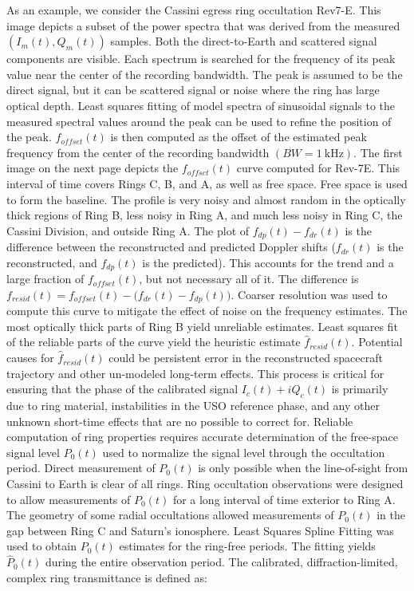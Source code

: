 \documentclass{article}
\theoremstyle{mystyle}
\begin{document}
\noindent As an example, we consider the Cassini egress ring occultation Rev7-E. This image depicts a subset of the power spectra that was derived from the measured $(I_{m}(t), Q_{m}(t))$ samples. Both the direct-to-Earth and scattered signal components are visible. Each spectrum is searched for the frequency of its peak value near the center of the recording bandwidth. The peak is assumed to be the direct signal, but it can be scattered signal or noise where the ring has large optical depth. Least squares fitting of model spectra of sinusoidal signals to the measured spectral values around the peak can be used to refine the position of the peak. $f_{offset}(t)$ is then computed as the offset of the estimated peak frequency from the center of the recording bandwidth $(BW = 1\ \textrm{kHz})$. The first image on the next page depicts the $f_{offset}(t)$ curve computed for Rev-7E. This interval of time covers Rings C, B, and A, as well as free space. Free space is used to form the baseline. The profile is very noisy and almost random in the optically thick regions of Ring B, less noisy in Ring A, and much less noisy in Ring C, the Cassini Division, and outside Ring A. The plot of $f_{dp}(t) - f_{dr}(t)$ is the difference between the reconstructed and predicted Doppler shifts ($f_{dr}(t)$ is the reconstructed, and $f_{dp}(t)$ is the predicted). This accounts for the trend and a large fraction of $f_{offset}(t)$, but not necessary all of it. The difference is $f_{resid}(t) = f_{offset}(t) - \big(f_{dr}(t)-f_{dp}(t)\big)$. Coarser resolution was used to compute this curve to mitigate the effect of noise on the frequency estimates.
\noindent The most optically thick parts of Ring B yield unreliable estimates. Least squares fit of the reliable parts of the curve yield the heuristic estimate $\hat{f}_{resid}(t)$. Potential causes for $\hat{f}_{resid}(t)$ could be persistent error in the reconstructed spacecraft trajectory and other un-modeled long-term effects. This process is critical for ensuring that the phase of the calibrated signal $I_{c}(t)+iQ_{c}(t)$ is primarily due to ring material, instabilities in the USO reference phase, and any other unknown short-time effects that are no possible to correct for. Reliable computation of ring properties requires accurate determination of the free-space signal level $P_{0}(t)$ used to normalize the signal level through the occultation period. Direct measurement of $P_{0}(t)$ is only possible when the line-of-sight from Cassini to Earth is clear of all rings. Ring occultation observations were designed to allow measurements of $P_{0}(t)$ for a long interval of time exterior to Ring A. The geometry of some radial occultations allowed measurements of $P_{0}(t)$ in the gap between Ring C and Saturn's ionosphere. Least Squares Spline Fitting was used to obtain $P_{0}(t)$ estimates for the ring-free periods. The fitting yields $\hat{P}_{0}(t)$ during the entire observation period. The calibrated, diffraction-limited, complex ring transmittance is defined as:
\end{document}

